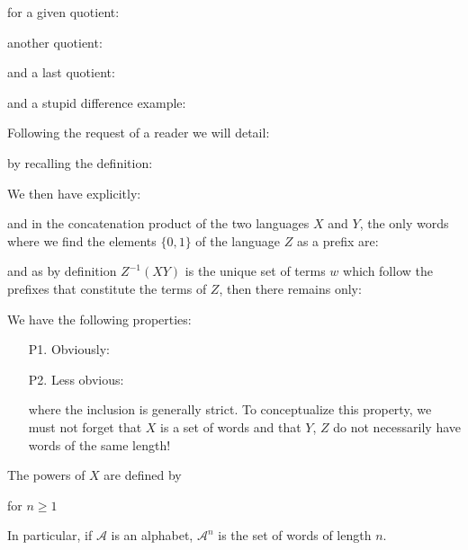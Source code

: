 	\begin{tcolorbox}[colframe=black,colback=white,sharp corners]
	for a given quotient:
	
	another quotient:
	
	and a last quotient:
	
	and a stupid difference example:
	
	Following the request of a reader we will detail:
	
	by recalling the definition:
	
	We then have explicitly:
	
	and in the concatenation product of the two languages $X$ and $Y$, the only words where we find the elements $\{0,1\}$ of the language $Z$ as a prefix are:
	
	and as by definition $Z^{-1}(XY)$ is the unique set of terms $w$ which follow the prefixes that constitute the terms of $Z$, then there remains only:
	
	\end{tcolorbox}
	We have the following properties:
	\begin{enumerate}
		\item[P1.] Obviously:
		

		\item[P2.] Less obvious:
		
		where the inclusion is generally strict. To conceptualize this property, we must not forget that $X$ is a set of words and that $Y$, $Z$ do not necessarily have words of the same length!
	\end{enumerate}	
	The powers of $X$ are defined by
	
	for $n\geq 1$

	In particular, if $\mathcal{A}$ is an alphabet, $\mathcal{A}^n$ is the set of words of length $n$.
	
